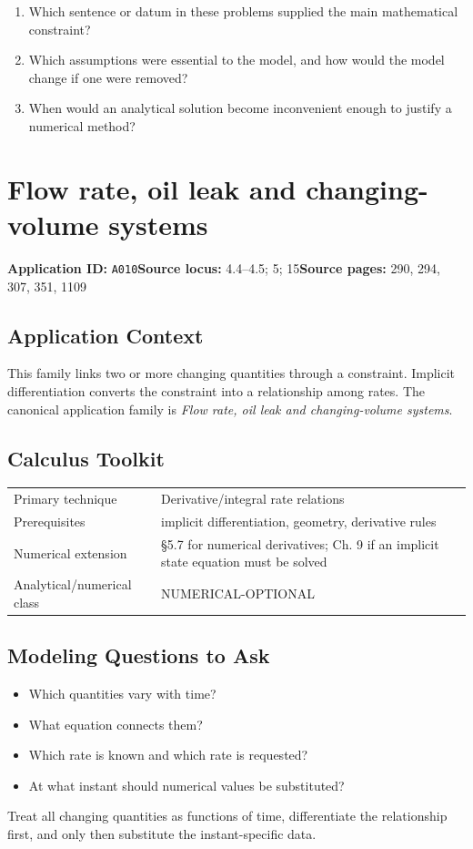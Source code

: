 \documentclass[11pt]{book}
\newcommand{\pid}[1]{\texttt{#1}}
\begin{document}
\begin{reflectionbox}\begin{enumerate}
\item Which sentence or datum in these problems supplied the main mathematical constraint?
\item Which assumptions were essential to the model, and how would the model change if one were removed?
\item When would an analytical solution become inconvenient enough to justify a numerical method?
\end{enumerate}\end{reflectionbox}
\chapter{Flow rate, oil leak and changing-volume systems}\label{app:A010}
\textbf{Application ID:} \pid{A010}\quad \textbf{Source locus:} 4.4–4.5; 5; 15\quad \textbf{Source pages:} 290, 294, 307, 351, 1109
\section*{Application Context}
This family links two or more changing quantities through a constraint. Implicit differentiation converts the constraint into a relationship among rates. The canonical application family is \emph{Flow rate, oil leak and changing-volume systems}.
\section*{Calculus Toolkit}
\begin{tabularx}{\textwidth}{@{}lX@{}}\toprule
Primary technique & Derivative/integral rate relations \\
Prerequisites & implicit differentiation, geometry, derivative rules \\
Numerical extension & §5.7 for numerical derivatives; Ch. 9 if an implicit state equation must be solved \\
Analytical/numerical class & NUMERICAL-OPTIONAL \\
\bottomrule\end{tabularx}
\section*{Modeling Questions to Ask}\begin{itemize}
\item Which quantities vary with time?
\item What equation connects them?
\item Which rate is known and which rate is requested?
\item At what instant should numerical values be substituted?
\end{itemize}
\begin{errorbox}Treat all changing quantities as functions of time, differentiate the relationship first, and only then substitute the instant-specific data.\end{errorbox}
\end{document}
